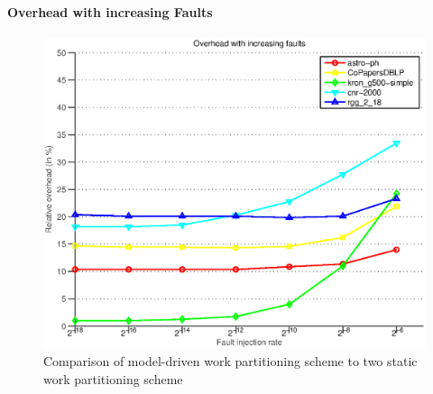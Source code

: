 \paragraph{Overhead with increasing Faults}

\begin{figure}[tbp]
\includegraphics[width=.5\textwidth]{plots/plot_overhead_fault.eps}
\caption{\label{fig:con-plot} 
\small Comparison of model-driven work partitioning scheme to
two static work partitioning scheme}
\end{figure}


